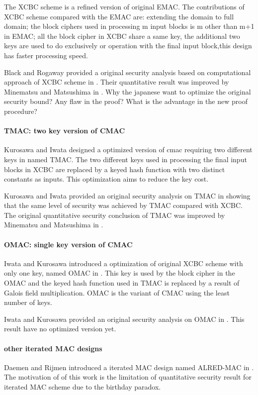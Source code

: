 \documentclass{article}
\begin{document}
The XCBC scheme is a refined version of original EMAC. The contributions of XCBC scheme compared with the EMAC are: extending the domain to full domain; the block ciphers used in processing m input blocks is m other than m+1 in EMAC; all the block cipher in XCBC share a same key, the additional two keys are used to do exclusively or operation with the final input block,this design has faster processing speed.   

Black and Rogaway provided a original security analysis based on computational approach of XCBC scheme in \cite{xcbc}. Their quantitative result was improved by Minematsu and Matsushima in \cite{new}. 
Why the japanese want to optimize the original security bound? Any flaw in the proof? What is the advantage in the new proof procedure?
\paragraph{TMAC: two key version of CMAC}
Kurosawa and Iwata designed a optimized version of cmac requiring two different keys in \cite{tmac} named TMAC.  
The two different keys used in processing the final input blocks in XCBC are replaced by a keyed hash function with two distinct constants as inputs. This optimization aims to reduce the key cost. 

Kurosawa and Iwata provided an original security analysis on TMAC in \cite{tmac} showing that the same level of security was achieved by TMAC compared with XCBC. The original quantitative security conclusion of TMAC was improved by Minematsu and Matsushima in \cite{new}. 
\paragraph{OMAC: single key version of CMAC}
Iwata and Kurosawa introduced a optimization of original XCBC scheme with only one key, named OMAC in \cite{omac}. This key is used by the block cipher in the OMAC and the keyed hash function used in TMAC is replaced by a result of Galois field multiplication. OMAC is the variant of CMAC using the least number of keys. 

Iwata and Kurosawa provided an original security analysis on OMAC in \cite{omac}. This result have no optimized version yet.
\paragraph{other iterated MAC designs}
Daemen and Rijmen introduced a iterated MAC design named ALRED-MAC in \cite{alred}. The motivation of of this work is the limitation of quantitative security result for iterated MAC scheme due to the birthday paradox. 
 
\end{document}
